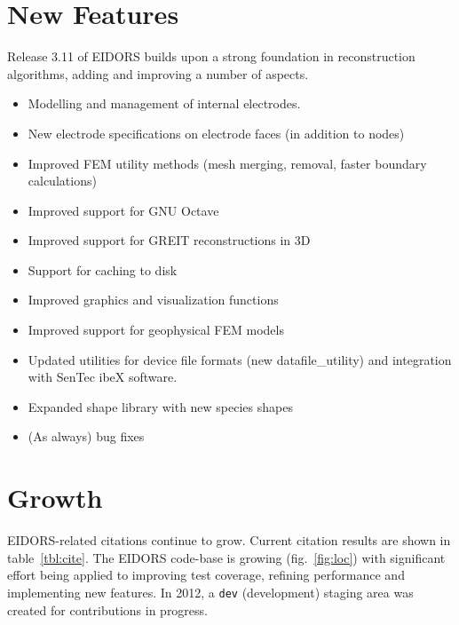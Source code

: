 \documentclass[10pt,letterpaper]{article}
\begin{document}
\section{New Features}
Release 3.11 of EIDORS builds upon a strong foundation in reconstruction
algorithms, adding and improving a number of aspects.
\begin{itemize}
\item Modelling and management of internal electrodes.

\item New electrode specifications on electrode faces (in addition to nodes)

\item Improved FEM utility methods (mesh merging, removal, faster boundary calculations)

\item Improved support for GNU Octave

\item Improved support for GREIT reconstructions in 3D \cite{grychtol2019}

\item Support for caching to disk

\item Improved graphics and visualization functions

\item Improved support for geophysical FEM models

\item Updated utilities for device file formats 
      (new datafile\_utility) and integration with
      SenTec ibeX software.

\item Expanded shape library with new species shapes

\item (As always) bug fixes 
\end{itemize}

\section{Growth}
EIDORS-related citations continue to grow. Current citation results are
shown in table~\ref{tbl:cite}.
%
The EIDORS code-base is growing
(fig.~\ref{fig:loc})
 with significant effort being applied to
improving test coverage, refining performance and implementing new features.
 In 2012, a {\tt dev} (development) staging area was created for
contributions in progress.
\end{document}
